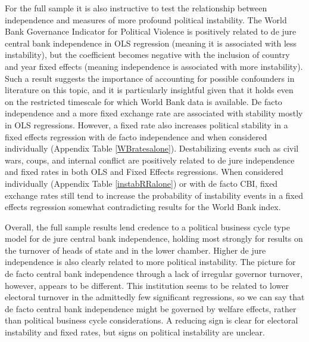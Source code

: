 \documentclass{article}
\begin{document}
    For the full sample it is also instructive to test the relationship between independence and measures of more profound political instability. The World Bank Governance Indicator for Political Violence is positively related to de jure central bank independence in OLS regression (meaning it is associated with less instability), but the coefficient becomes negative with the inclusion of country and year fixed effects (meaning independence is associated with more instability). Such a result suggests the importance of accounting for possible confounders in literature on this topic, and it is particularly insightful given that it holds even on the restricted timescale for which World Bank data is available. De facto independence and a more fixed exchange rate are associated with stability mostly in OLS regressions. However, a fixed rate also increases political stability in a fixed effects regression with de facto independence and when considered individually (Appendix Table \ref*{WBratesalone}). Destabilizing events such as civil wars, coups, and internal conflict are positively related to de jure independence and fixed rates in both OLS and Fixed Effects regressions. When considered individually (Appendix Table \ref*{instabRRalone}) or with de facto CBI, fixed exchange rates still tend to increase the probability of instability events in a fixed effects regression somewhat contradicting results for the World Bank index.

    Overall, the full sample results lend credence to a political business cycle type model for de jure central bank independence, holding most strongly for results on the turnover of heads of state and in the lower chamber. Higher de jure independence is also clearly related to more political instability. The picture for de facto central bank independence through a lack of irregular governor turnover, however, appears to be different. This institution seems to be related to lower electoral turnover in the admittedly few significant regressions, so we can say that de facto central bank independence might be governed by welfare effects, rather than political business cycle considerations. A reducing sign is clear for electoral instability and fixed rates, but signs on political instability are unclear.
    
\end{document}
